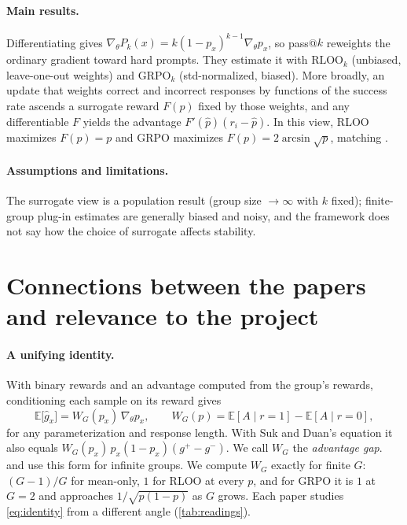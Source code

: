 \documentclass{article}
\theoremstyle{definition}
\newcommand{\E}{\mathbb{E}}
\newcommand{\1}{\mathbf{1}}
\begin{document}
\paragraph{Main results.}
Differentiating gives
$\nabla_\theta P_k(x)=k(1-p_x)^{k-1}\nabla_\theta p_x$, so pass@$k$
reweights the ordinary gradient toward hard prompts. They estimate it
with $\mathrm{RLOO}_k$ (unbiased, leave-one-out weights) and
$\mathrm{GRPO}_k$ (std-normalized, biased). More broadly, an update that
weights correct and incorrect responses by functions of the success rate
ascends a surrogate reward $F(p)$ fixed by those weights, and any
differentiable $F$ yields the advantage $F'(\hat p)(r_i-\hat p)$. In this view, RLOO maximizes $F(p)=p$ and GRPO maximizes
$F(p)=2\arcsin\sqrt{p}$, matching \citet{davis2025objective}.

\paragraph{Assumptions and limitations.}
The surrogate view is a population result (group size $\to\infty$ with
$k$ fixed); finite-group plug-in estimates are generally biased and
noisy, and the framework does not say how the choice of surrogate
affects stability.

\section{Connections between the papers and relevance to the project}
\label{sec:synthesis}

\paragraph{A unifying identity.}
With binary rewards and an advantage computed from the group's
rewards, conditioning each sample on its reward gives
\begin{equation}
  \label{eq:identity}
  \E\big[\widehat g_x\big]
  = W_G(p_x)\,\nabla_\theta p_x,
  \qquad
  W_G(p)=\E[A\mid r{=}1]-\E[A\mid r{=}0],
\end{equation}
for any parameterization and response length. With Suk and Duan's
equation it also equals $W_G(p_x)\,p_x(1-p_x)(g^+-g^-)$. We call $W_G$ the
\emph{advantage gap}. \citet{davis2025objective} and
\citet{heckel2026asymmetric} use this form for infinite groups. We
compute $W_G$ exactly for finite $G$: $(G-1)/G$ for
mean-only, $1$ for RLOO at every $p$, and for GRPO it is $1$ at
$G=2$ and approaches $1/\sqrt{p(1-p)}$ as $G$ grows. Each paper studies
\eqref{eq:identity} from a different angle (\cref{tab:readings}).
\end{document}

